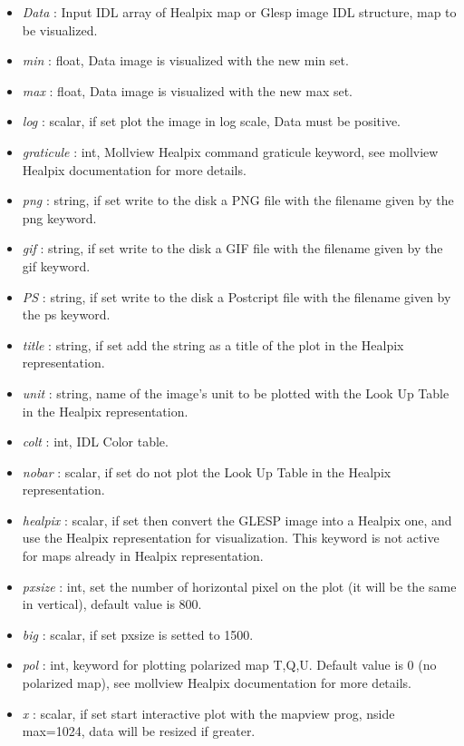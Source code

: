 \begin{itemize}
\item {\em Data} : Input IDL array of Healpix map or Glesp image IDL structure, map to be visualized.
\item {\em min} : float, Data image is visualized with the new min set.
\item {\em max} : float, Data image is visualized with the new max set.
\item {\em log} : scalar, if set plot the image in log scale, Data must be positive.
\item {\em graticule} : int, Mollview Healpix command graticule keyword, see mollview Healpix documentation for more details.
\item {\em png} : string, if set write to the disk a PNG file with the filename given by the png keyword.
\item {\em gif} : string, if set write to the disk a GIF file with the filename given by the gif keyword.
\item {\em PS} : string, if set write to the disk a Postcript file with the filename given by the ps keyword.
\item {\em title} : string, if set add the string as a title of the plot in the Healpix representation.
\item {\em unit} : string, name of the image's unit to be plotted with the Look Up Table in the Healpix representation.
\item {\em colt} : int, IDL Color table.
\item {\em nobar} : scalar, if set do not plot the Look Up Table in the Healpix representation.
\item {\em healpix} : scalar, if set then convert the GLESP image into a Healpix one, and use the Healpix 
representation for visualization. This keyword is not active for maps already in Healpix representation.
\item {\em pxsize} : int, set the number of horizontal pixel on the plot (it will be the same in vertical), default value is 800.
\item {\em big} : scalar, if set pxsize is setted to 1500.
\item {\em pol} : int, keyword for plotting polarized map T,Q,U. Default value is 0 (no polarized map), see mollview Healpix documentation for more details.
\item {\em x} : scalar, if set start interactive plot with the mapview prog, nside max=1024, data will be resized if greater.
\end{itemize}



